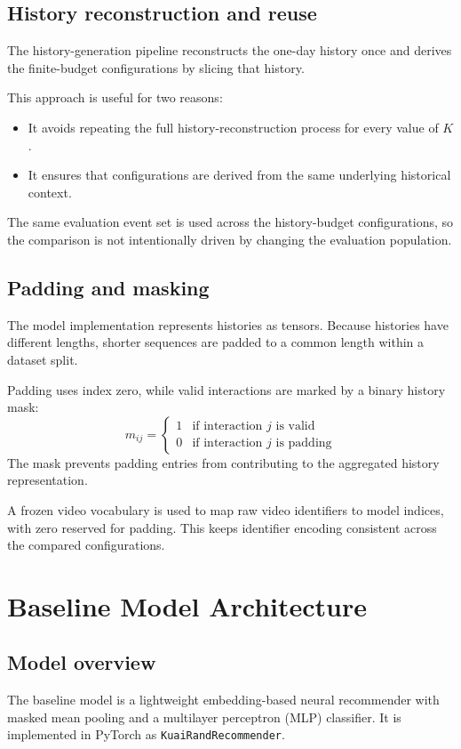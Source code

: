 \documentclass[11pt,a4paper]{article}
\begin{document}
\subsection{History reconstruction and reuse}
The history-generation pipeline reconstructs the one-day history once and derives the finite-budget configurations by slicing that history.

This approach is useful for two reasons:
\begin{itemize}
    \item It avoids repeating the full history-reconstruction process for every value of $K$.
    \item It ensures that configurations are derived from the same underlying historical context.
\end{itemize}
The same evaluation event set is used across the history-budget configurations, so the comparison is not intentionally driven by changing the evaluation population.

\subsection{Padding and masking}
The model implementation represents histories as tensors. Because histories have different lengths, shorter sequences are padded to a common length within a dataset split.

Padding uses index zero, while valid interactions are marked by a binary history mask:
\begin{equation}
m_{ij} = \begin{cases}
1 & \text{if interaction } j \text{ is valid} \\
0 & \text{if interaction } j \text{ is padding}
\end{cases}
\end{equation}
The mask prevents padding entries from contributing to the aggregated history representation.

A frozen video vocabulary is used to map raw video identifiers to model indices, with zero reserved for padding. This keeps identifier encoding consistent across the compared configurations.

\section{Baseline Model Architecture}
\subsection{Model overview}
The baseline model is a lightweight embedding-based neural recommender with
masked mean pooling and a multilayer perceptron (MLP) classifier.
It is implemented in PyTorch as \texttt{KuaiRand\-Recommender}.
\end{document}
